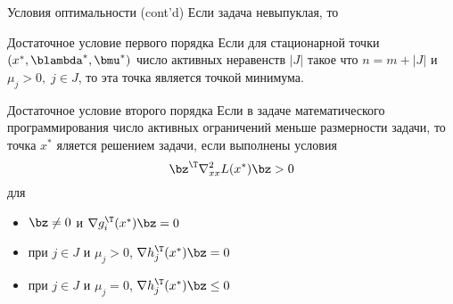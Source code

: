 \documentclass[12pt]{beamer}
\begin{document}
\begin{frame}{Условия оптимальности (cont'd)}
\small
Если задача невыпуклая, то
\begin{block}{Достаточное условие первого порядка}
\small
Если для стационарной точки $(x^*, \blambda^*, \bmu^*)$ число активных неравенств $|J|$ такое что $n = m + |J|$ и $\mu_j > 0, \; j \in J$, то эта точка является точкой минимума.
\end{block}

\begin{block}{Достаточное условие второго порядка}
\small
Если в задаче математического программирования число активных ограничений меньше размерности задачи, то точка $x^*$ яляется решением задачи, если выполнены условия
\vspace{-3mm}
\[
\bz^{\T}\nabla_{xx}^2 L(x^*)\bz > 0
\vspace{-3mm}
\] 
для 
\vspace{-4mm}
\begin{itemize}
\item $\bz \neq 0$ и $\nabla g^{\T}_i(x^*)\bz = 0$
\vspace{-3mm}
\item при $j \in J$ и $\mu_j > 0$, $\nabla h^{\T}_j(x^*) \bz = 0$
\vspace{-3mm}
\item при $j \in J$ и $\mu_j = 0$, $\nabla h^{\T}_j(x^*) \bz \leq 0$
\end{itemize}
\end{block}

\end{frame}
\end{document}
